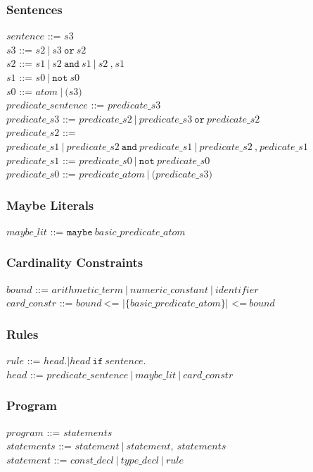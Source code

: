 \documentclass[a4paper,10pt]{article}
\begin{document}
\subsubsection{Sentences}

$sentence$ ::= $s3$ \\
$s3$ ::= $s2~|~s3~\texttt{or}~s2$\\
$s2$ ::= $s1~|~s2~\texttt{and}~s1~|~s2~\texttt{,}~s1$
\\
$s1$ ::= $s0~|~\texttt{not}~s0$\\ 
$s0$ ::= $atom~|~\texttt{(}s3\texttt{)}$ \\
$predicate\_sentence$ ::= $predicate\_s3$ \\
$predicate\_s3$ ::= $predicate\_s2~|~predicate\_s3~\texttt{or}~predicate\_s2$\\
$predicate\_s2$ ::= $predicate\_s1~|~predicate\_s2~\texttt{and}~predicate\_s1~|~predicate\_s2~\texttt{,}~pedicate\_s1$
\\
$predicate\_s1$ ::= $predicate\_s0~|~\texttt{not}~predicate\_s0$\\ 
$predicate\_s0$ ::= $predicate\_atom~|~\texttt{(}predicate\_s3\texttt{)}$ 


\subsubsection{Maybe Literals}
$maybe\_lit$ ::= $\texttt{maybe}~basic\_predicate\_atom$\\
\subsubsection{Cardinality Constraints}
$bound$ ::= $arithmetic\_term~|~numeric\_constant~|~identifier$\\
$card\_constr$ ::= $bound~ \texttt{<= |\{}  basic\_predicate\_atom \texttt{\}| <=} ~bound$\\

\subsubsection{Rules}
$rule$ ::= $head \texttt{.} | head~\texttt{if}~sentence \texttt{.} $ \\
$head$ ::= $predicate\_sentence~|~maybe\_lit~|~card\_constr$
 
\subsubsection{Program}
$program$ ::= $statements$\\
$statements$ ::= $statement~|~statement,~statements$\\
$statement$ ::= $ const\_decl~|~type\_decl~|~rule$ 
\end{document}

